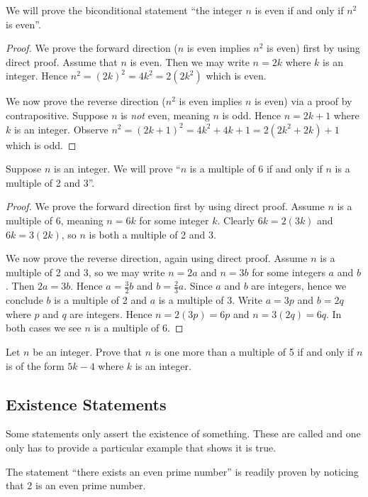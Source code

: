 \begin{example}
    We will prove the biconditional statement ``the integer $n$ is even if and only if $n^2$ is even''.
    \begin{proof}
        We prove the forward direction ($n$ is even implies $n^2$ is even) first by using direct proof. Assume that $n$ is even. Then we may write $n = 2k$ where $k$ is an integer. Hence $n^2 = (2k)^2 = 4k^2 = 2(2k^2)$ which is even.

        We now prove the reverse direction ($n^2$ is even implies $n$ is even) via a proof by contrapositive. Suppose $n$ is \textit{not} even, meaning $n$ is odd. Hence $n = 2k + 1$ where $k$ is an integer. Observe $n^2 = (2k+1)^2 = 4k^2 + 4k + 1 = 2(2k^2 + 2k) + 1$ which is odd.
    \end{proof}
\end{example}

\begin{example}
    Suppose $n$ is an integer. We will prove ``$n$ is a multiple of 6 if and only if $n$ is a multiple of 2 and 3''.
    \begin{proof}
        We prove the forward direction first by using direct proof. Assume $n$ is a multiple of 6, meaning $n = 6k$ for some integer $k$. Clearly $6k = 2(3k)$ and $6k = 3(2k)$, so $n$ is both a multiple of 2 and 3.

        We now prove the reverse direction, again using direct proof. Assume $n$ is a multiple of 2 and 3, so we may write $n = 2a$ and $n = 3b$ for some integers $a$ and $b$. Then $2a = 3b$. Hence $a = \frac 32 b$ and $b = \frac 23 a$. Since $a$ and $b$ are integers, hence we conclude $b$ is a multiple of 2 and $a$ is a multiple of 3. Write $a = 3p$ and $b = 2q$ where $p$ and $q$ are integers. Hence $n = 2(3p) = 6p$ and $n = 3(2q) = 6q$. In both cases we see $n$ is a multiple of 6.
    \end{proof}
\end{example}

\begin{exercise}
    Let $n$ be an integer. Prove that $n$ is one more than a multiple of 5 if and only if $n$ is of the form $5k - 4$ where $k$ is an integer.
\end{exercise}

\subsection{Existence Statements}
Some statements only assert the existence of something. These are called  and one only has to provide a particular example that shows it is true.
\begin{example}
    The statement ``there exists an even prime number'' is readily proven by noticing that 2 is an even prime number.
\end{example}

